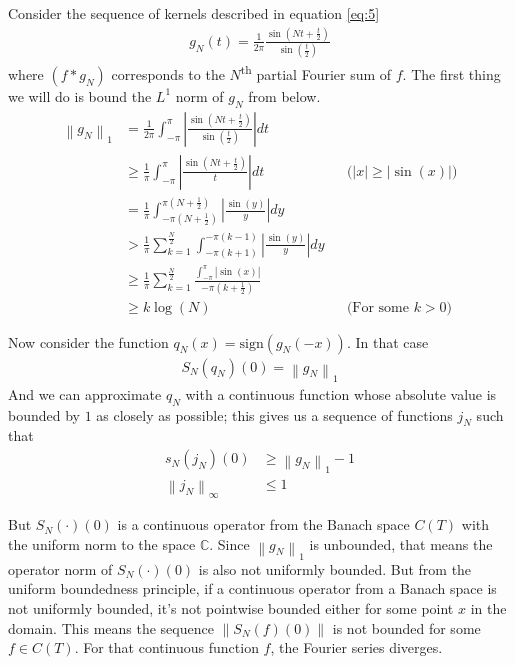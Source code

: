 \documentclass[12pt, titlepage]{article}
\theoremstyle{definition}
\newcommand{\norm}[1]{\left\lVert#1\right\rVert}
\begin{document}
Consider the sequence of kernels described in equation \ref{eq:5}
\begin{align*}
    g_N(t) = \frac{1}{2\pi} \frac{\sin\left( Nt + \frac{t}{2} \right)}{\sin\left( \frac{t}{2} \right)}
\end{align*}
where $(f \ast g_N)$ corresponds to the $N$\textsuperscript{th} partial Fourier sum of $f$. The first thing we will do is bound the $L^1$ norm of $g_N$ from below.
\begin{align*}
    \norm{g_N}_1 &= \frac{1}{2\pi} \int_{-\pi}^{\pi} \left| \frac{\sin \left( Nt + \frac{t}{2} \right)}{\sin \left( \frac{t}{2} \right)} \right| dt \\
    &\geq \frac{1}{\pi} \int_{-\pi}^{\pi}\left| \frac{\sin \left( Nt + \frac{t}{2} \right)}{t} \right|dt &&\text{($|x| \geq |\sin(x)|$)} \\
    &= \frac{1}{\pi} \int_{-\pi\left( N+\frac{1}{2} \right)}^{\pi\left( N+\frac{1}{2} \right)} \left| \frac{\sin(y)}{y} \right| dy \\
    &> \frac{1}{\pi} \sum_{k=1}^{\frac{N}{2}} \int_{-\pi\left( k +1 \right)}^{-\pi\left( k - 1 \right)} \left| \frac{\sin(y)}{y} \right| dy \\
    &\geq \frac{1}{\pi} \sum_{k=1}^{\frac{N}{2}} \frac{\int_{-\pi}^{\pi} |\sin(x)|}{-\pi\left( k + \frac{1}{2} \right)} \\
    &\geq k \log(N) &&\text{(For some $k>0$)}
\end{align*}

Now consider the function $q_N(x) = \mathrm{sign}(g_N(-x))$. In that case
\begin{align*}
    S_N(q_N)(0) = \norm{g_N}_1
\end{align*}
And we can approximate $q_N$ with a continuous function whose absolute value is bounded by $1$ as closely as possible; this gives us a sequence of functions $j_N$ such that
\begin{align*}
    s_N(j_N)(0) &\geq \norm{g_N}_1 - 1 \\
    \norm{j_N}_\infty &\leq 1
\end{align*}

But $S_N(\cdot)(0)$ is a continuous operator from the Banach space $C(T)$ with the uniform norm to the space $\mathbb{C}$. Since $\norm{g_N}_1$ is unbounded, that means the operator norm of $S_N(\cdot)(0)$ is also not uniformly bounded. But from the uniform boundedness principle, if a continuous operator from a Banach space is not uniformly bounded, it's not pointwise bounded either for some point $x$ in the domain. This means the sequence $\norm{S_N(f)(0)}$ is not bounded for some $f \in C(T)$. For that continuous function $f$, the Fourier series diverges.
\newpage
\end{document}
